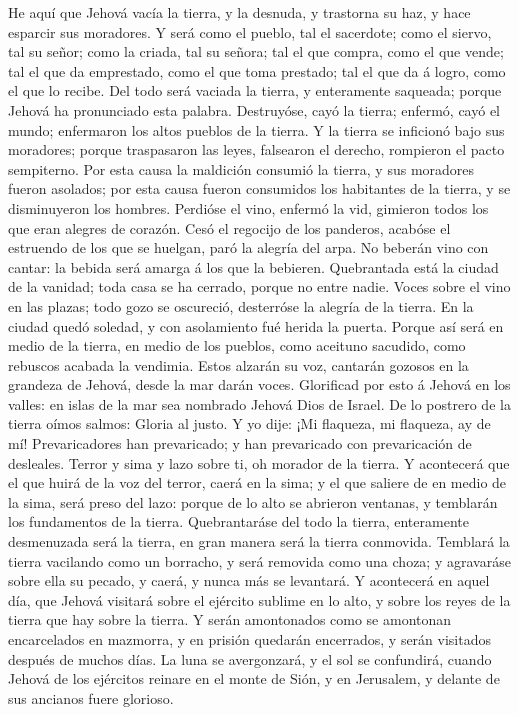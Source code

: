  He aquí que Jehová vacía la tierra, y la desnuda, y
trastorna su haz, y hace esparcir sus moradores.  Y será
como el pueblo, tal el sacerdote; como el siervo, tal su señor; como la
criada, tal su señora; tal el que compra, como el que vende; tal el que
da emprestado, como el que toma prestado; tal el que da á logro, como el
que lo recibe.  Del todo será vaciada la tierra, y
enteramente saqueada; porque Jehová ha pronunciado esta palabra.
 Destruyóse, cayó la tierra; enfermó, cayó el mundo;
enfermaron los altos pueblos de la tierra.  Y la tierra se
inficionó bajo sus moradores; porque traspasaron las leyes, falsearon el
derecho, rompieron el pacto sempiterno.  Por esta causa la
maldición consumió la tierra, y sus moradores fueron asolados; por esta
causa fueron consumidos los habitantes de la tierra, y se disminuyeron
los hombres.  Perdióse el vino, enfermó la vid, gimieron
todos los que eran alegres de corazón.  Cesó el regocijo de
los panderos, acabóse el estruendo de los que se huelgan, paró la
alegría del arpa.  No beberán vino con cantar: la bebida
será amarga á los que la bebieren.  Quebrantada está la
ciudad de la vanidad; toda casa se ha cerrado, porque no entre nadie.
 Voces sobre el vino en las plazas; todo gozo se oscureció,
desterróse la alegría de la tierra.  En la ciudad quedó
soledad, y con asolamiento fué herida la puerta.  Porque
así será en medio de la tierra, en medio de los pueblos, como aceituno
sacudido, como rebuscos acabada la vendimia.  Estos alzarán
su voz, cantarán gozosos en la grandeza de Jehová, desde la mar darán
voces.  Glorificad por esto á Jehová en los valles: en
islas de la mar sea nombrado Jehová Dios de Israel.  De lo
postrero de la tierra oímos salmos: Gloria al justo. Y yo dije: ¡Mi
flaqueza, mi flaqueza, ay de mí! Prevaricadores han prevaricado; y han
prevaricado con prevaricación de desleales.  Terror y sima
y lazo sobre ti, oh morador de la tierra.  Y acontecerá que
el que huirá de la voz del terror, caerá en la sima; y el que saliere de
en medio de la sima, será preso del lazo: porque de lo alto se abrieron
ventanas, y temblarán los fundamentos de la tierra. 
Quebrantaráse del todo la tierra, enteramente desmenuzada será la
tierra, en gran manera será la tierra conmovida.  Temblará
la tierra vacilando como un borracho, y será removida como una choza; y
agravaráse sobre ella su pecado, y caerá, y nunca más se levantará.
 Y acontecerá en aquel día, que Jehová visitará sobre el
ejército sublime en lo alto, y sobre los reyes de la tierra que hay
sobre la tierra.  Y serán amontonados como se amontonan
encarcelados en mazmorra, y en prisión quedarán encerrados, y serán
visitados después de muchos días.  La luna se avergonzará,
y el sol se confundirá, cuando Jehová de los ejércitos reinare en el
monte de Sión, y en Jerusalem, y delante de sus ancianos fuere glorioso.

